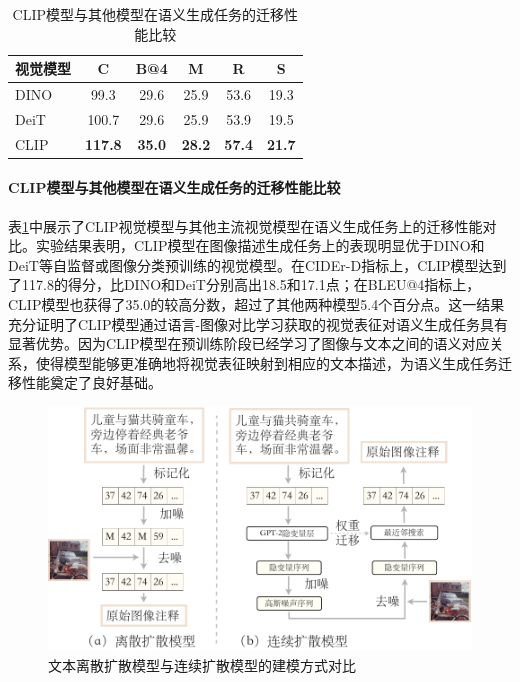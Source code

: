 \begin{table}
  \centering
  \caption{CLIP模型与其他模型在语义生成任务的迁移性能比较}
  \begin{tabular}{lccccc}
    \toprule
    视觉模型  & C & B@4 & M & R & S\\
    \midrule
    DINO & 99.3  & 29.6 & 25.9 & 53.6 & 19.3 \\
    DeiT & 100.7 & 29.6 & 25.9 & 53.9 & 19.5 \\
    CLIP  & \textbf{117.8} & \textbf{35.0} & \textbf{28.2} & \textbf{57.4} & \textbf{21.7}\\
    \bottomrule
  \end{tabular}
  \label{tab:ddcap-cmp-clip}
\end{table}

\paragraph{CLIP模型与其他模型在语义生成任务的迁移性能比较}
表\ref{tab:ddcap-cmp-clip}中展示了CLIP视觉模型与其他主流视觉模型在语义生成任务上的迁移性能对比。实验结果表明，CLIP模型在图像描述生成任务上的表现明显优于DINO\cite{dino}和DeiT\cite{deit}等自监督或图像分类预训练的视觉模型。在CIDEr-D指标上，CLIP模型达到了117.8的得分，比DINO和DeiT分别高出18.5和17.1点；在BLEU@4指标上，CLIP模型也获得了35.0的较高分数，超过了其他两种模型5.4个百分点。这一结果充分证明了CLIP模型通过语言-图像对比学习获取的视觉表征对语义生成任务具有显著优势。因为CLIP模型在预训练阶段已经学习了图像与文本之间的语义对应关系，使得模型能够更准确地将视觉表征映射到相应的文本描述，为语义生成任务迁移性能奠定了良好基础。

\begin{figure}
  \centering
  \includegraphics[width=0.8\linewidth]{figures/ddcap-cmp-continuous.pdf}
  \caption{文本离散扩散模型与连续扩散模型的建模方式对比}
  \label{fig:ddcap-cmp-continuous}
\end{figure}

